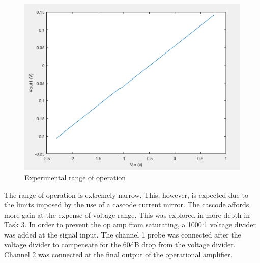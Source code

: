 		
		\begin{figure}[H]
			\begin{center}
				\includegraphics[scale=.40]{ExperimentalImplementation/VTC.png}
				\caption{Experimental range of operation}
				\label{fig:vtc}
			\end{center}
		\end{figure}
		
		The range of operation is extremely narrow. This, however, is expected due to the limits imposed by the use of a cascode current mirror. The cascode affords more gain at the expense of voltage range. This was explored in more depth in Task 3. In order to prevent the op amp from saturating, a 1000:1 voltage divider was added at the signal input. The channel 1 probe was connected after the voltage divider to compensate for the 60dB drop from the voltage divider. Channel 2 was connected at the final output of the operational amplifier. 
		
